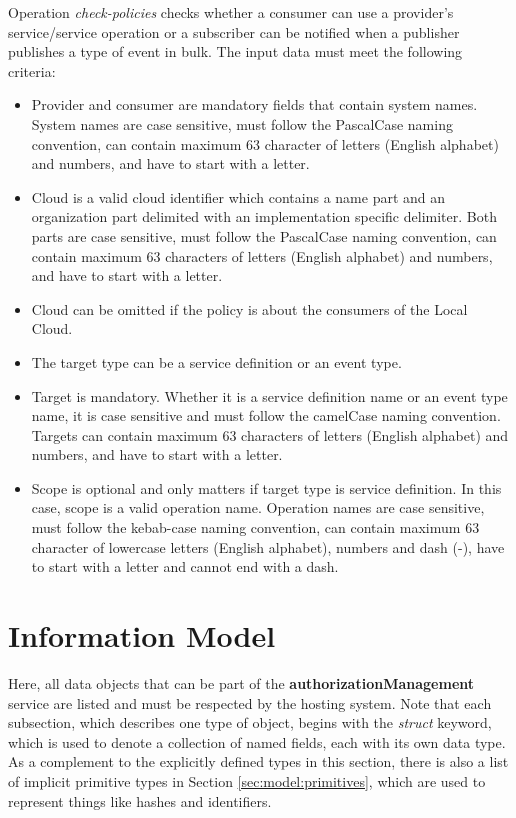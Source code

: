 \documentclass[a4paper]{arrowhead}
\begin{document}
Operation \textit{check-policies} checks whether a consumer can use a provider's service/service operation or a subscriber can be notified when a publisher publishes a type of event in bulk. The input data must meet the following criteria:

\begin{itemize}
    \item Provider and consumer are mandatory fields that contain system names. System names are case sensitive, must follow the PascalCase naming convention, can contain maximum 63 character of letters (English alphabet) and numbers, and have to start with a letter.
    \item Cloud is a valid cloud identifier which contains a name part and an organization part delimited with an implementation specific delimiter. Both parts are case sensitive, must follow the PascalCase naming convention, can contain maximum 63 characters of letters (English alphabet) and numbers, and have to start with a letter.
    \item Cloud can be omitted if the policy is about the consumers of the Local Cloud. 
    \item The target type can be a service definition or an event type.
    \item Target is mandatory. Whether it is a service definition name or an event type name, it is case sensitive and must follow the camelCase naming convention. Targets can contain maximum 63 characters of letters (English alphabet) and numbers, and have to start with a letter.
    \item Scope is optional and only matters if target type is service definition. In this case, 
    scope is a valid operation name. Operation names are case sensitive, must follow the kebab-case naming convention, can contain maximum 63 character of lowercase letters (English alphabet), numbers and dash (-), have to start with a letter and cannot end with a dash.
\end{itemize}

\clearpage

\section{Information Model}
\label{sec:model}

Here, all data objects that can be part of the \textbf{authorizationManagement} service are listed and must be respected by the hosting system.
Note that each subsection, which describes one type of object, begins with the \textit{struct} keyword, which is used to denote a collection of named fields, each with its own data type.
As a complement to the explicitly defined types in this section, there is also a list of implicit primitive types in Section \ref{sec:model:primitives}, which are used to represent things like hashes and identifiers.
\end{document}
